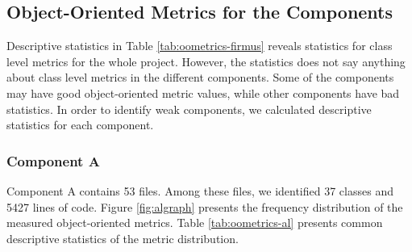
\subsection{Object-Oriented Metrics for the Components}
\label{subsec:oometric-comp}
Descriptive statistics in Table \ref{tab:oometrics-firmus} reveals statistics for class level metrics for the whole project. However, the statistics does not say anything about class level metrics in the different components. Some of the components may have good object-oriented metric values, while other components have bad statistics. In order to identify weak components, we calculated descriptive statistics for each component. 

\subsubsection{Component A}
Component A contains 53 files. Among these files, we identified 37 classes and 5427 lines of code. Figure \ref{fig:algraph} presents the frequency distribution of the measured object-oriented metrics. Table \ref{tab:oometrics-al} presents common descriptive statistics of the metric distribution.

